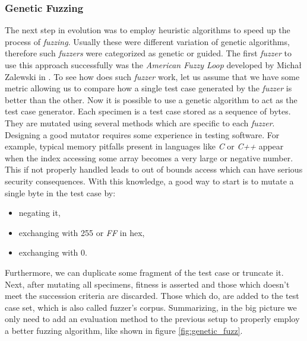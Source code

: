 \subsubsection{Genetic Fuzzing}

The next step in evolution was to employ heuristic algorithms to speed up the process of \textit{fuzzing}. Usually these were different variation of genetic algorithms, therefore such \textit{fuzzers} were categorized as genetic or guided. The first \textit{fuzzer} to use this approach successfully was the \textit{American Fuzzy Loop} developed by Michał Zalewski in \cite{afl}. To see how does such \textit{fuzzer} work, let us assume that we have some metric allowing us to compare how a single test case generated by the \textit{fuzzer} is better than the other. Now it is possible to use a genetic algorithm to act as the test case generator. Each specimen is a test case stored as a sequence of bytes. They are mutated using several methods which are specific to each \textit{fuzzer}. Designing a good mutator requires some experience in testing software. For example, typical memory pitfalls present in languages like \textit{C} or \textit{C++} appear when the index accessing some array becomes a very large or negative number. This if not properly handled leads to out of bounds access which can have serious security consequences. With this knowledge, a good way to start is to mutate a single byte in the test case by:
\begin{itemize}
    \item negating it,
    \item exchanging with 255 or \textit{FF} in hex,
    \item exchanging with 0.
\end{itemize}
Furthermore, we can duplicate some fragment of the test case or truncate it. Next, after mutating all specimens, fitness is asserted and those which doesn't meet the succession criteria are discarded. Those which do, are added to the test case set, which is also called fuzzer's corpus. Summarizing, in the big picture we only need to add an evaluation method to the previous setup to properly employ a better fuzzing algorithm, like shown in figure \ref{fig:genetic_fuzz}.  

